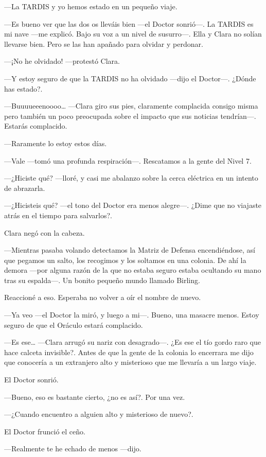 ---La TARDIS y yo hemos estado en un pequeño viaje.

---Es bueno ver que las dos os lleváis bien ---el Doctor sonrió---. La
TARDIS es mi nave ---me explicó. Bajo su voz a un nivel de susurro---.
Ella y Clara no solían llevarse bien. Pero se las han apañado para
olvidar y perdonar.

---¡No he olvidado! ---protestó Clara.

---Y estoy seguro de que la TARDIS no ha olvidado ---dijo el Doctor---.
¿Dónde has estado?.

---Buuuueeenoooo\ldots{} ---Clara giro sus pies, claramente complacida
consigo misma pero también un poco preocupada sobre el impacto que sus
noticias tendrían---. Estarás complacido.

---Raramente lo estoy estos días.

---Vale ---tomó una profunda respiración---. Rescatamos a la gente del
Nivel 7.

---¿Hiciste qué? ---lloré, y casi me abalanzo sobre la cerca eléctrica
en un intento de abrazarla.

---¿Hicisteis qué? ---el tono del Doctor era menos alegre---. ¿Dime que
no viajaste atrás en el tiempo para salvarlos?.

Clara negó con la cabeza.

---Mientras pasaba volando detectamos la Matriz de Defensa
encendiéndose, así que pegamos un salto, los recogimos y los soltamos en
una colonia. De ahí la demora ---por alguna razón de la que no estaba
seguro estaba ocultando su mano tras su espalda---. Un bonito pequeño
mundo llamado Birling.

Reaccioné a eso. Esperaba no volver a oír el nombre de nuevo.

---Ya veo ---el Doctor la miró, y luego a mi---. Bueno, una masacre
menos. Estoy seguro de que el Oráculo estará complacido.

---Es ese\ldots{} ---Clara arrugó su nariz con desagrado---. ¿Es ese el
tío gordo raro que hace calceta invisible?. Antes de que la gente de la
colonia lo encerrara me dijo que conocería a un extranjero alto y
misterioso que me llevaría a un largo viaje.

El Doctor sonrió.

---Bueno, eso es bastante cierto, ¿no es así?. Por una vez.

---¿Cuando encuentro a alguien alto y misterioso de nuevo?.

El Doctor frunció el ceño.

---Realmente te he echado de menos ---dijo.

